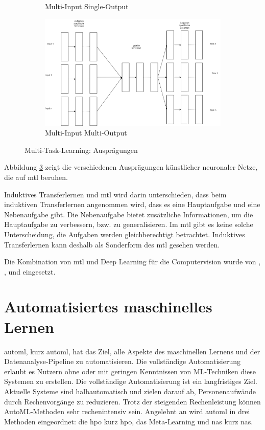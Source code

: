 \begin{figure}[h]
\begin{subfigure}[c]{0.49\textwidth}
				\caption[MTL-MISO]{Multi-Input Single-Output}
				\label{img:MTL_MISO}	
			\end{subfigure}
			\begin{subfigure}[c]{0.49\textwidth}			
				\includegraphics[width=1\textwidth, center]{bilder/Grundlagen/MTL/MTL_MIMO.png}
				\caption[MTL-MIMO]{Multi-Input Multi-Output}
				\label{img:MTL-MIMO}	
			\end{subfigure}
			\caption{Multi-Task-Learning: Ausprägungen}
			\label{img:MultiTaskLernen}
		\end{figure}
		Abbildung \ref{img:MultiTaskLernen} zeigt die verschiedenen Ausprägungen künstlicher neuronaler Netze, die auf \ac{mtl} beruhen.
		
		Induktives Transferlernen und \acl{mtl} wird darin unterschieden, dass beim induktiven Transferlernen angenommen wird, dass es eine Hauptaufgabe und eine Nebenaufgabe gibt. Die Nebenaufgabe bietet zusätzliche Informationen, um die Hauptaufgabe zu verbessern, bzw. zu generalisieren. Im \ac{mtl} gibt es keine solche Unterscheidung, die Aufgaben werden gleichberechtigt betrachtet. Induktives Transferlernen kann deshalb als Sonderform des \acl{mtl} gesehen werden. 
		
		Die Kombination von \acl{mtl} und Deep Learning für die Computervision wurde von \cite{YuchunFang.2017}, \cite{Li.2016}, \cite{RajeevRanjan.2016} und \cite{Zhao.2019} eingesetzt.

	\section{Automatisiertes maschinelles Lernen}
	\label{sec:AutoML}
  \acl{automl}, kurz \ac{automl}, hat das Ziel, alle Aspekte des maschinellen Lernens und der Datenanalyse-Pipeline zu automatisieren. Die vollständige Automatisierung erlaubt es Nutzern ohne oder mit geringen Kenntnissen von ML-Techniken diese Systemen zu erstellen. Die vollständige Automatisierung ist ein langfristiges Ziel. Aktuelle Systeme sind halbautomatisch und zielen darauf ab, Personenaufwände durch Rechenvorgänge zu reduzieren. Trotz der steigenden Rechenleistung können AutoML-Methoden sehr rechenintensiv sein. Angelehnt an \cite{Hutter.2019} wird \ac{automl} in drei Methoden eingeordnet: die \acl{hpo} kurz \ac{hpo}, das  Meta-Learning und \acl{nas} kurz \ac{nas}. 
	
